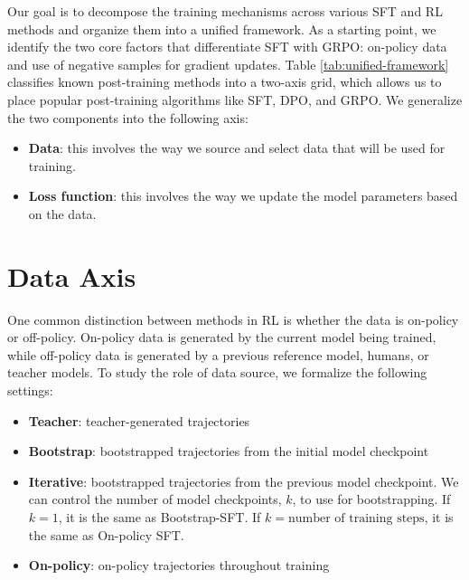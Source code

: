 \documentclass[12pt]{cmuthesis}
\begin{document}
Our goal is to decompose the training mechanisms across various SFT and RL methods and organize them into a unified framework. As a starting point, we identify the two core factors that differentiate SFT with GRPO: on-policy data and use of negative samples for gradient updates. Table \ref{tab:unified-framework} classifies known post-training methods into a two-axis grid, which allows us to place popular post-training algorithms like SFT, DPO, and GRPO.
We generalize the two components into the following axis:
\begin{itemize}
    \item \textbf{Data}: this involves the way we source and select data that will be used for training. 
    \item \textbf{Loss function}: this involves the way we update the model parameters based on the data.
\end{itemize}
   
   
\section{Data Axis}

One common distinction between methods in RL is whether the data is on-policy or off-policy. On-policy data is generated by the current model being trained, while off-policy data is generated by a previous reference model, humans, or teacher models. To study the role of data source, we formalize the following settings:

\begin{itemize}
    \item \textbf{Teacher}: teacher-generated trajectories
    \item \textbf{Bootstrap}: bootstrapped trajectories from the initial model checkpoint
    \item \textbf{Iterative}: bootstrapped trajectories from the previous model checkpoint. We can control the number of model checkpoints, $k$, to use for bootstrapping. If $k=1$, it is the same as Bootstrap-SFT. If $k=\text{number of training steps}$, it is the same as On-policy SFT.
    \item \textbf{On-policy}: on-policy trajectories throughout training
\end{itemize}
\end{document}
